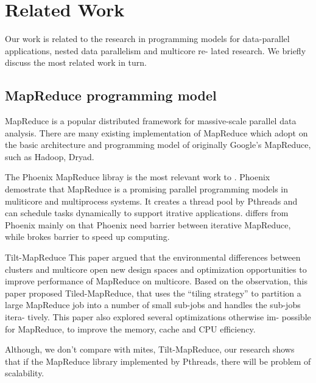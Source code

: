 \section{Related Work}
\label{sec:rel}

Our work is related to the research in programming models for
data-parallel applications, nested data parallelism and multicore re-
lated research. We briefly discuss the most related work in turn.
\subsection{MapReduce programming model}
MapReduce is a popular distributed framework
for massive-scale parallel data analysis.
There are many existing implementation of MapReduce 
which adopt on the basic architecture and 
programming model of originally Google's MapReduce, 
such as Hadoop\cite{}, Dryad\cite{isard2007dryad}.

The Phoenix MapReduce libray
is the most relevant work to \myds. 
Phoenix demostrate that MapReduce is a promising parallel programming
models in muliticore and multiprocess systems.
It creates a thread pool by Pthreads
and can schedule tasks dynamically to support itrative applications.
\myds differs from Phoenix mainly on that 
Phoenix need barrier between iterative MapReduce,
while \myds brokes barrier to speed up computing.

Tilt-MapReduce\cite{chen2010tiled}
This paper argued that the environmental differences between
clusters and multicore open new design spaces and optimization
opportunities to improve performance of MapReduce on multicore.
Based on the observation, this paper proposed Tiled-MapReduce,
that uses the “tiling strategy” to partition a large MapReduce job
into a number of small sub-jobs and handles the sub-jobs itera-
tively. This paper also explored several optimizations otherwise im-
possible for MapReduce, to improve the memory, cache and CPU
efficiency.

Although, we don't compare \myds with mites, Tilt-MapReduce,
our research shows that if the MapReduce library implemented by Pthreads, there will be problem of scalability.

